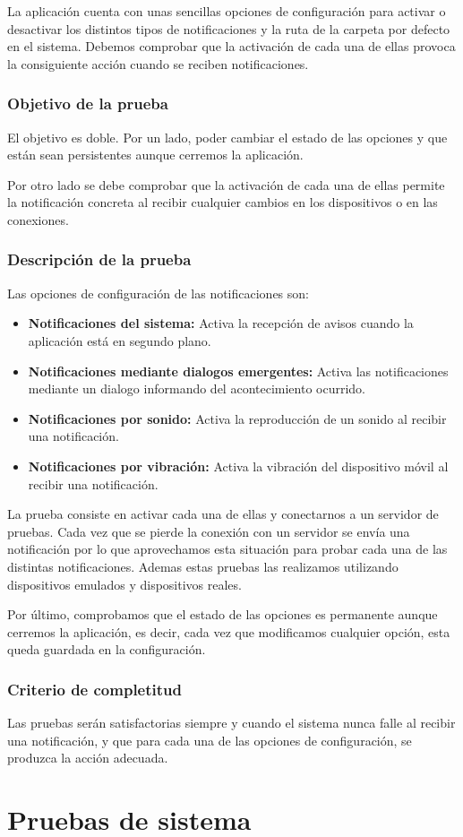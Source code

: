La aplicación cuenta con unas sencillas opciones de configuración para activar o desactivar los distintos tipos de notificaciones y la ruta de la carpeta por defecto en el sistema. Debemos comprobar que la activación de cada una de ellas provoca la consiguiente acción cuando se reciben notificaciones.


\subsubsection{Objetivo de la prueba}

El objetivo es doble. Por un lado, poder cambiar el estado de las opciones y que están sean persistentes aunque cerremos la aplicación.

\bigskip
Por otro lado se debe comprobar que la activación de cada una de ellas permite la notificación concreta al recibir cualquier cambios en los dispositivos o en las conexiones.


\subsubsection{Descripción de la prueba}

Las opciones de configuración de las notificaciones son:

\begin{itemize}
  \item \textbf{Notificaciones del sistema:} Activa la recepción de avisos cuando la aplicación está en segundo plano.
  \item \textbf{Notificaciones mediante dialogos emergentes:} Activa las notificaciones mediante un dialogo informando del acontecimiento ocurrido.
  \item \textbf{Notificaciones por sonido:} Activa la reproducción de un sonido al recibir una notificación.
  \item \textbf{Notificaciones por vibración:} Activa la vibración del dispositivo móvil al recibir una notificación.
\end{itemize}

\bigskip
La prueba consiste en activar cada una de ellas y conectarnos a un servidor de pruebas. Cada vez que se pierde la conexión con un servidor se envía una notificación por lo que aprovechamos esta situación para probar cada una de las distintas notificaciones. Ademas estas pruebas las realizamos utilizando dispositivos emulados y dispositivos reales.

\bigskip
Por último, comprobamos que el estado de las opciones es permanente aunque cerremos la aplicación, es decir, cada vez que modificamos cualquier opción, esta queda guardada en la configuración.

\subsubsection{Criterio de completitud}

Las pruebas serán satisfactorias siempre y cuando el sistema nunca falle al recibir una notificación, y que para cada una de las opciones de configuración, se produzca la acción adecuada.


\newpage
\section{Pruebas de sistema}
